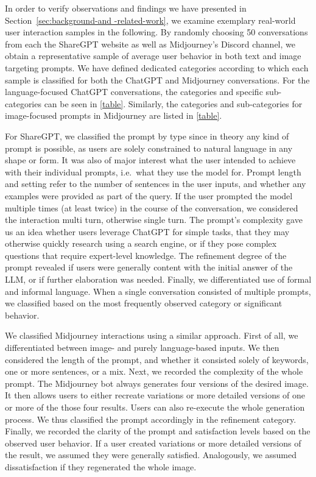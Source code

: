 In order to verify observations and findings we have presented in Section~\ref{sec:background-and
-related-work},
we examine exemplary real-world user interaction samples in the following.
By randomly choosing 50 conversations from each the ShareGPT website as well as Midjourney's Discord
channel, we obtain a representative sample of average user behavior in both text and image targeting prompts.
We have defined dedicated categories according to which each sample is classified for both
the ChatGPT and Midjourney conversations.
For the language-focused ChatGPT conversations, the categories and specific sub-categories can be
seen in \ref{table}.
Similarly, the categories and sub-categories for image-focused prompts in Midjourney are listed
in \ref{table}.

For ShareGPT, we classified the prompt by type since in theory any kind of prompt is possible,
as users are solely constrained to natural language in any shape or form.
It was also of major interest what the user intended to achieve with their individual prompts,
i.e.\ what they use the model for.
Prompt length and setting refer to the number of sentences in the user inputs, and whether
any examples were provided as part of the query.
If the user prompted the model multiple times (at least twice) in the course of the conversation, we considered the interaction multi turn, otherwise single turn.
The prompt's complexity gave us an idea whether users leverage ChatGPT for simple
tasks, that they may otherwise quickly research using a search engine, or if they pose complex
questions that require expert-level knowledge.
The refinement degree of the prompt revealed if users were generally content with the initial
answer of the LLM, or if further elaboration was needed.
Finally, we differentiated use of formal and informal language.
When a single conversation consisted of multiple prompts, we classified based on the most
frequently observed category or significant behavior.

We classified Midjourney interactions using a similar approach.
First of all, we differentiated between image- and purely language-based inputs.
We then considered the length of the prompt, and whether it consisted solely of keywords, one
or more sentences, or a mix.
Next, we recorded the complexity of the whole prompt.
The Midjourney bot always generates four versions of the desired image.
It then allows users to either recreate variations or more detailed versions of one or more of
the those four results.
Users can also re-execute the whole generation process.
We thus classified the prompt accordingly in the refinement category.
Finally, we recorded the clarity of the prompt and satisfaction levels based
on the observed user behavior.
If a user created variations or more detailed versions of the result, we assumed they were
generally satisfied.
Analogously, we assumed dissatisfaction if they regenerated the whole image.

